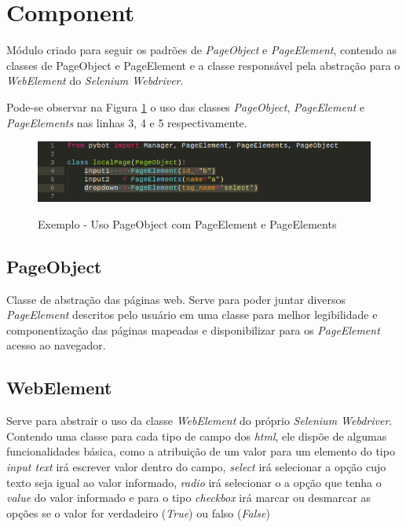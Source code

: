     \section{Component} \label{sec:comp}
        Módulo criado para seguir os padrões de \textit{PageObject} e \textit{PageElement}, contendo as classes de PageObject e PageElement e a classe responsável
        pela abstração para o \textit{WebElement} do \textit{Selenium Webdriver}.

        Pode-se observar na Figura \ref{fig:eleme} o uso das classes \textit{PageObject}, \textit{PageElement} e \textit{PageElements} nas linhas 3, 4 e 5 respectivamente.

        \begin{figure}[H]
            \vspace*{0,3cm}
            \centering
            \caption{Exemplo - Uso PageObject com PageElement e PageElements}
            \includegraphics[width=1\textwidth]{./04-figuras/pageElement}
            \label{fig:eleme}
        \end{figure}

        \subsection{PageObject}
            Classe de abstração das páginas web. Serve para poder juntar diversos \textit{PageElement} descritos pelo usuário em uma classe para melhor legibilidade e componentização das
            páginas mapeadas e disponibilizar para os \textit{PageElement} acesso ao navegador.

        \subsection{WebElement}
            Serve para abstrair o uso da classe \textit{WebElement} do próprio \textit{Selenium Webdriver}. Contendo uma classe para cada tipo de campo dos \textit{html},
            ele dispõe de algumas funcionalidades básica, como a atribuição de um valor para um elemento do tipo \textit{input text} irá escrever
            valor dentro do campo, \textit{select} irá selecionar a opção cujo texto seja igual ao valor informado, \textit{radio} irá selecionar o
            a opção que tenha o \textit{value} do valor informado e para o tipo \textit{checkbox} irá marcar ou desmarcar as opções se o valor for
            verdadeiro (\textit{True}) ou falso (\textit{False})

